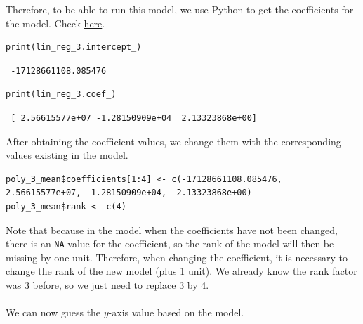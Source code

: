 \documentclass[a4paper]{article}
\begin{document}
Therefore, to be able to run this model, we use Python to get the coefficients for the model. Check \href{https://colab.research.google.com/drive/1ixVXEsUy2YtcCrayuPR6mmMf80pT92nh#scrollTo=BNuGVxNW7V_B}{here}.
\begin{mdframed}[leftline=false,rightline=false,backgroundcolor=lightblue!10,nobreak=false]
    \begin{verbatim}
print(lin_reg_3.intercept_)
    \end{verbatim}
\end{mdframed}
\begin{lstlisting}
 -17128661108.085476
\end{lstlisting}
\begin{mdframed}[leftline=false,rightline=false,backgroundcolor=lightblue!10,nobreak=false]
    \begin{verbatim}
print(lin_reg_3.coef_)
    \end{verbatim}
\end{mdframed}
\begin{lstlisting}
 [ 2.56615577e+07 -1.28150909e+04  2.13323868e+00]
\end{lstlisting}
After obtaining the coefficient values, we change them with the corresponding values existing in the model.
\begin{mdframed}[leftline=false,rightline=false,backgroundcolor=lightblue!10,nobreak=false]
    \begin{verbatim}
poly_3_mean$coefficients[1:4] <- c(-17128661108.085476, 2.56615577e+07, -1.28150909e+04,  2.13323868e+00)
poly_3_mean$rank <- c(4)
    \end{verbatim}
\end{mdframed}
Note that because in the model when the coefficients have not been changed, there is an \verb|NA| value for the coefficient, so the rank of the model will then be missing by one unit. Therefore, when changing the coefficient, it is necessary to change the rank of the new model (plus 1 unit). We already know the rank factor was 3 before, so we just need to replace 3 by 4.\\\\
We can now guess the $y$-axis value based on the model.
\end{document}

